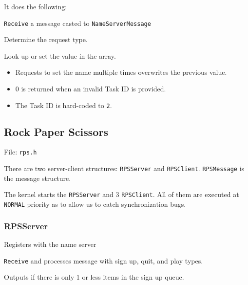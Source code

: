\documentclass[letterpaper, 12pt]{article}
\begin{document}
It does the following:
\begin{list}{.}
{
\setlength{\rightmargin}{\leftmargin}
}

\item \texttt{Receive} a message casted to \texttt{NameServerMessage}

\item Determine the request type.

\item Look up or set the value in the array.
\end{list}
%
\begin{itemize}

\item Requests to set the name multiple times overwrites the previous value.

\item 0 is returned when an invalid Task ID is provided.

\item The Task ID is hard-coded to \texttt{2}.

\end{itemize}


\subsection{Rock Paper Scissors%
  \label{rock-paper-scissors}%
}

File: \texttt{rps.h}

There are two server-client structures: \texttt{RPSServer} and \texttt{RPSClient}. \texttt{RPSMessage} is the message structure.

The kernel starts the \texttt{RPSServer} and 3 \texttt{RPSClient}. All of them are executed at \texttt{NORMAL} priority as to allow us to catch synchronization bugs.


\subsubsection{RPSServer%
  \label{rpsserver}%
}
\setcounter{listcnt0}{0}
\begin{list}{.}
{
\setlength{\rightmargin}{\leftmargin}
}

\item Registers with the name server

\item \texttt{Receive} and processes message with sign up, quit, and play types.

\item Outputs if there is only 1 or less items in the sign up queue.
\end{list}
\end{document}
